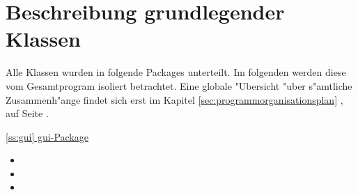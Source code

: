 \section{Beschreibung grundlegender Klassen}
Alle Klassen wurden in folgende Packages unterteilt. Im folgenden werden diese vom Gesamtprogram isoliert betrachtet. Eine globale "Ubersicht "uber s"amtliche Zusammenh"ange findet sich erst im Kapitel \ref{sec:programmorganisationsplan} , auf Seite \pageref{sec:programmorganisationsplan}. 

\bigbreak

{\large \underline{\ref{ss:gui} gui-Package}}
\begin{itemize}
	\item {}
	\item {}
	\item {}
\end{itemize}

\bigbreak

